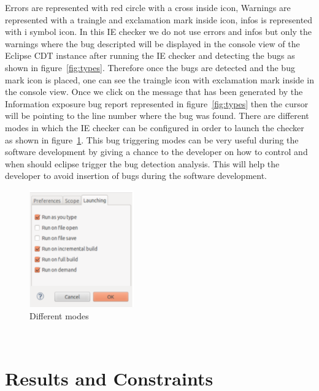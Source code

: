 Errors are represented with red circle with a cross inside icon, Warnings are represented
with a traingle and exclamation mark inside icon, infos is represented with i symbol icon.
In this IE checker we do not use errors and infos but only the warnings
where the bug descripted will be displayed in the console view of
the Eclipse CDT instance after running the IE checker and detecting
the bugs as shown in figure~\ref{fig:types}. Therefore once the bugs are
detected and the bug mark icon is placed, one can see the traingle icon 
with exclamation mark inside in the console view. Once we click on the
message that has been generated by the Information exposure bug report
represented in figure~\ref{fig:types} then the cursor will be pointing
to the line number where the bug was found. There are different modes in which
the IE checker can be configured in order to launch the checker as shown 
in figure~\ref{fig:modes}. This bug triggering modes can be very useful during the 
software development by giving a chance to the developer on how to control
and when should eclipse trigger the bug detection analysis. This will help the
developer to avoid insertion of bugs during the software development.
\begin{figure}[!htb]
\centering
\includegraphics[width=0.4\textwidth]{png/modes.png}
\caption{Different modes}
\label{fig:modes}
\end{figure}\\

\section{Results and Constraints}




